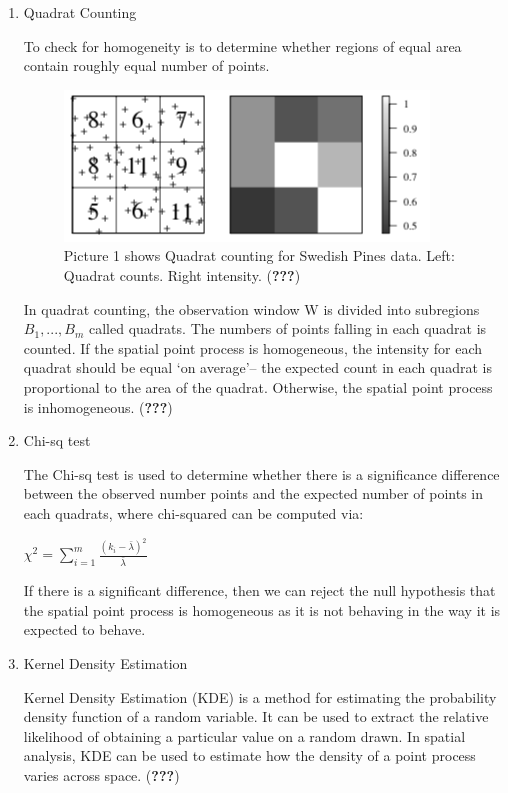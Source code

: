 \documentclass[]{article}
\begin{document}
\begin{enumerate}
\def\labelenumi{\arabic{enumi}.}
\item
  Quadrat Counting

  To check for homogeneity is to determine whether regions of equal area
  contain roughly equal number of points.

  \begin{figure}
  \centering
  \includegraphics{pictures/quadratcount.png}
  \caption{Picture 1 shows Quadrat counting for Swedish Pines data.
  Left: Quadrat counts. Right intensity. ({\textbf{???}})}
  \end{figure}

  In quadrat counting, the observation window W is divided into
  subregions \(B_{1},...,B_{m}\) called quadrats. The numbers of points
  falling in each quadrat is counted. If the spatial point process is
  homogeneous, the intensity for each quadrat should be equal `on
  average'-- the expected count in each quadrat is proportional to the
  area of the quadrat. Otherwise, the spatial point process is
  inhomogeneous. ({\textbf{???}})
\item
  Chi-sq test

  The Chi-sq test is used to determine whether there is a significance
  difference between the observed number points and the expected number
  of points in each quadrats, where chi-squared can be computed via:

  \(\chi^2=\sum_{i=1}^m\frac{(k_i-\bar{\lambda})^2}{\bar{\lambda}}\)

  If there is a significant difference, then we can reject the null
  hypothesis that the spatial point process is homogeneous as it is not
  behaving in the way it is expected to behave.
\item
  Kernel Density Estimation

  Kernel Density Estimation (KDE) is a method for estimating the
  probability density function of a random variable. It can be used to
  extract the relative likelihood of obtaining a particular value on a
  random drawn. In spatial analysis, KDE can be used to estimate how the
  density of a point process varies across space. ({\textbf{???}})


\end{enumerate}
\end{document}
